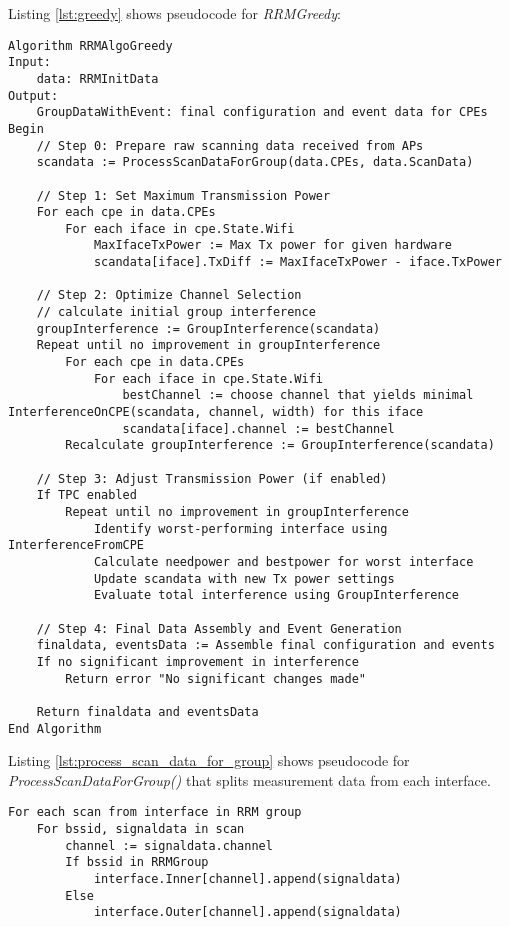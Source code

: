 Listing \ref{lst:greedy} shows pseudocode for \textit{RRMGreedy}:
\begin{lstlisting}[language={Pseudo}, caption=greedy RRM algorithm, label=lst:greedy]
Algorithm RRMAlgoGreedy
Input:
    data: RRMInitData
Output:
    GroupDataWithEvent: final configuration and event data for CPEs
Begin
    // Step 0: Prepare raw scanning data received from APs
    scandata := ProcessScanDataForGroup(data.CPEs, data.ScanData)

    // Step 1: Set Maximum Transmission Power
    For each cpe in data.CPEs
        For each iface in cpe.State.Wifi
            MaxIfaceTxPower := Max Tx power for given hardware
            scandata[iface].TxDiff := MaxIfaceTxPower - iface.TxPower

    // Step 2: Optimize Channel Selection
    // calculate initial group interference
    groupInterference := GroupInterference(scandata)
    Repeat until no improvement in groupInterference
        For each cpe in data.CPEs
            For each iface in cpe.State.Wifi
                bestChannel := choose channel that yields minimal InterferenceOnCPE(scandata, channel, width) for this iface
                scandata[iface].channel := bestChannel
        Recalculate groupInterference := GroupInterference(scandata)

    // Step 3: Adjust Transmission Power (if enabled)
    If TPC enabled
        Repeat until no improvement in groupInterference
            Identify worst-performing interface using InterferenceFromCPE
            Calculate needpower and bestpower for worst interface
            Update scandata with new Tx power settings
            Evaluate total interference using GroupInterference

    // Step 4: Final Data Assembly and Event Generation
    finaldata, eventsData := Assemble final configuration and events
    If no significant improvement in interference
        Return error "No significant changes made"

    Return finaldata and eventsData
End Algorithm
\end{lstlisting}

Listing \ref{lst:process_scan_data_for_group} shows pseudocode for \textit{ProcessScanDataForGroup()} that splits measurement data from each interface.

\begin{lstlisting}[language={Pseudo},caption=ProcessScanDataForGroup pseuodocode, label=lst:process_scan_data_for_group]
For each scan from interface in RRM group
    For bssid, signaldata in scan
        channel := signaldata.channel
        If bssid in RRMGroup
            interface.Inner[channel].append(signaldata)
        Else
            interface.Outer[channel].append(signaldata)
\end{lstlisting}



